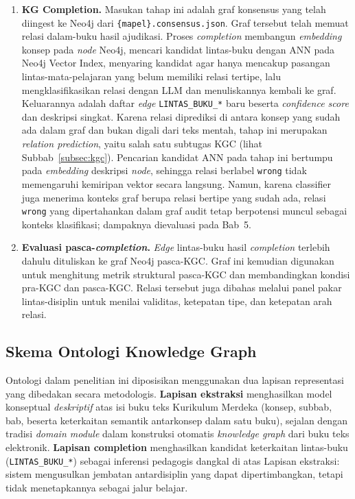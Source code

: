 \documentclass[../../thesis]{subfiles}
\begin{document}
\begin{enumerate}[resume]
  \item \textbf{KG Completion.} Masukan tahap ini adalah graf konsensus
        yang telah diingest ke Neo4j dari
        \texttt{\{mapel\}.consensus.json}. Graf tersebut telah memuat relasi
        dalam-buku hasil ajudikasi. Proses \textit{completion} membangun
        \textit{embedding} konsep pada \textit{node} Neo4j, mencari kandidat
        lintas-buku dengan ANN pada Neo4j Vector Index, menyaring kandidat agar
        hanya mencakup pasangan lintas-mata-pelajaran yang belum memiliki
        relasi tertipe, lalu mengklasifikasikan relasi dengan LLM dan
        menuliskannya kembali ke graf. Keluarannya adalah daftar \textit{edge}
        \texttt{LINTAS\_BUKU\_*} baru beserta \textit{confidence score}
        dan deskripsi singkat. Karena relasi diprediksi di antara konsep yang
        sudah ada dalam graf dan bukan digali dari teks mentah, tahap ini
        merupakan \textit{relation prediction}, yaitu salah satu subtugas KGC
        (lihat Subbab~\ref{subsec:kgc}).
        Pencarian kandidat ANN pada tahap ini bertumpu pada \textit{embedding}
        deskripsi \textit{node}, sehingga relasi berlabel \texttt{wrong} tidak
        memengaruhi kemiripan vektor secara langsung. Namun, karena classifier
        juga menerima konteks graf berupa relasi bertipe yang sudah ada,
        relasi \texttt{wrong} yang dipertahankan dalam graf audit tetap
        berpotensi muncul sebagai konteks klasifikasi; dampaknya dievaluasi pada
        Bab~5.

  \item \textbf{Evaluasi pasca-\textit{completion}.} \textit{Edge}
        lintas-buku hasil \textit{completion} terlebih dahulu dituliskan
        ke graf Neo4j pasca-KGC. Graf ini kemudian digunakan untuk
        menghitung metrik struktural pasca-KGC dan membandingkan kondisi
        pra-KGC dan pasca-KGC. Relasi tersebut juga dibahas melalui panel
        pakar lintas-disiplin untuk menilai validitas, ketepatan tipe,
        dan ketepatan arah relasi.
\end{enumerate}

\subsection{Skema Ontologi Knowledge Graph}
\label{subsec:skema-ontologi}

Ontologi dalam penelitian ini diposisikan menggunakan dua lapisan
representasi yang dibedakan secara metodologis. \textbf{Lapisan
ekstraksi} menghasilkan model konseptual \textit{deskriptif} atas isi
buku teks Kurikulum Merdeka (konsep, subbab, bab, beserta
keterkaitan semantik antarkonsep dalam satu buku), sejalan dengan
tradisi \textit{domain module} dalam konstruksi otomatis \textit{knowledge
graph} dari buku teks elektronik. \textbf{Lapisan completion} menghasilkan kandidat
keterkaitan lintas-buku (\texttt{LINTAS\_BUKU\_*}) sebagai inferensi
pedagogis dangkal di atas Lapisan ekstraksi: sistem mengusulkan jembatan
antardisiplin yang dapat dipertimbangkan, tetapi tidak menetapkannya
sebagai jalur belajar.
\end{document}
